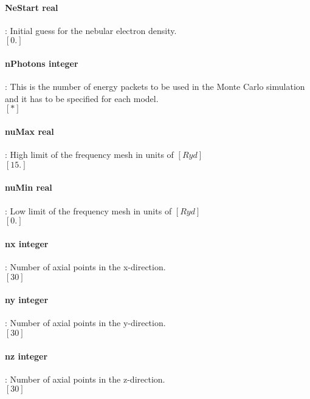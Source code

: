 \documentclass[11pt]{article}
\begin{document}
\paragraph   { NeStart real   }  : Initial guess for the nebular electron density. \\
		     $[0.]$\\

\paragraph   { nPhotons integer}: This is the number of energy packets to be used in the Monte 
		     Carlo simulation and it has to be specified for each model.\\
		     $[*]$ \\

\paragraph   { nuMax real  }    : High limit of the frequency mesh in units of $[Ryd]$\\
		     $[15.]$\\

\paragraph   { nuMin real }     : Low limit of the frequency mesh in units of $[Ryd]$\\
		     $[0.]$\\

\paragraph   { nx integer }     : Number of axial points in the x-direction.\\
		     $[30]$\\

\paragraph  {  ny integer}      : Number of axial points in the y-direction.\\
		     $[30]$\\

\paragraph  {  nz integer  }    : Number of axial points in the z-direction.\\
		     $[30]$\\
\end{document}
